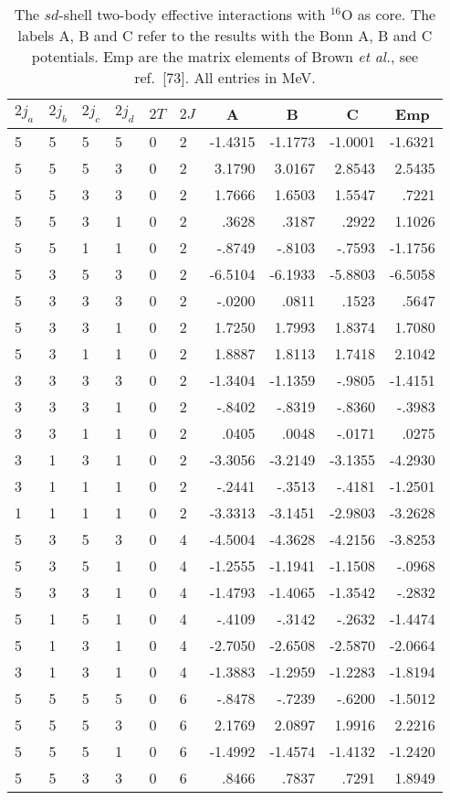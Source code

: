 \begin{table}[hbtp]
\caption{The $sd$-shell two-body effective interactions with $^{16}$O as core.
The labels A, B and C refer to the results with the Bonn A, B and
C potentials. Emp are the matrix elements of Brown {\em et al.},
see ref.\ [73]. 
All entries in MeV.}
\small
\begin{center}
\begin{tabular}{llllllrrrr}
\hline
$2j_{a}$&$2j_{b}$&$2j_{c}$&$2j_{d}$&$2T$&$2J$&
\multicolumn{1}{c}{A}&
\multicolumn{1}{c}{B}&
\multicolumn{1}{c}{C}&
\multicolumn{1}{c}{Emp}\\\hline
  5& 5& 5& 5& 0& 2& -1.4315& -1.1773& -1.0001&-1.6321\\
  5& 5& 5& 3& 0& 2&  3.1790&  3.0167&  2.8543&2.5435\\
  5& 5& 3& 3& 0& 2&  1.7666&  1.6503&  1.5547&.7221\\
  5& 5& 3& 1& 0& 2&   .3628&   .3187&   .2922&1.1026\\
  5& 5& 1& 1& 0& 2&  -.8749&  -.8103&  -.7593&-1.1756\\
  5& 3& 5& 3& 0& 2& -6.5104& -6.1933& -5.8803&-6.5058\\
  5& 3& 3& 3& 0& 2&  -.0200&   .0811&   .1523&.5647\\
  5& 3& 3& 1& 0& 2&  1.7250&  1.7993&  1.8374&1.7080\\
  5& 3& 1& 1& 0& 2&  1.8887&  1.8113&  1.7418&2.1042\\
  3& 3& 3& 3& 0& 2& -1.3404& -1.1359&  -.9805&-1.4151\\
  3& 3& 3& 1& 0& 2&  -.8402&  -.8319&  -.8360&-.3983\\
  3& 3& 1& 1& 0& 2&   .0405&   .0048&  -.0171&.0275\\
  3& 1& 3& 1& 0& 2& -3.3056& -3.2149& -3.1355&-4.2930\\
  3& 1& 1& 1& 0& 2&  -.2441&  -.3513&  -.4181&-1.2501\\
  1& 1& 1& 1& 0& 2& -3.3313& -3.1451& -2.9803&-3.2628\\
  5& 3& 5& 3& 0& 4& -4.5004& -4.3628& -4.2156&-3.8253\\
  5& 3& 5& 1& 0& 4& -1.2555& -1.1941& -1.1508&-.0968\\
  5& 3& 3& 1& 0& 4& -1.4793& -1.4065& -1.3542&-.2832\\
  5& 1& 5& 1& 0& 4&  -.4109&  -.3142&  -.2632&-1.4474\\
  5& 1& 3& 1& 0& 4& -2.7050& -2.6508& -2.5870&-2.0664\\
  3& 1& 3& 1& 0& 4& -1.3883& -1.2959& -1.2283&-1.8194\\
  5& 5& 5& 5& 0& 6&  -.8478&  -.7239&  -.6200&-1.5012\\
  5& 5& 5& 3& 0& 6&  2.1769&  2.0897&  1.9916&2.2216\\
  5& 5& 5& 1& 0& 6& -1.4992& -1.4574& -1.4132&-1.2420\\
  5& 5& 3& 3& 0& 6&   .8466&   .7837&   .7291&1.8949\\
\hline
\end{tabular}
\end{center}
\label{tab:sdveff}
\end{table}
